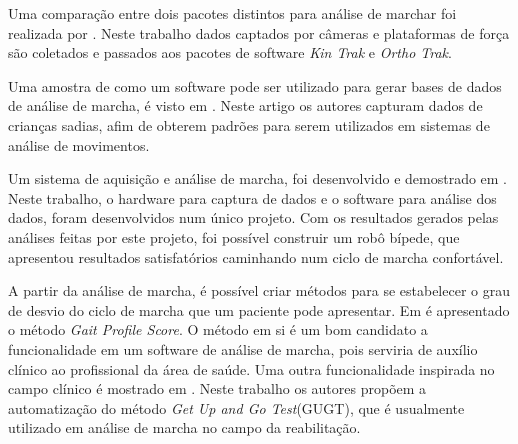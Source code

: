 Uma comparação entre dois pacotes distintos para análise de marchar foi realizada por . 
Neste trabalho dados captados por câmeras e plataformas de força são coletados e passados aos pacotes de software \emph{Kin Trak} e \emph{Ortho Trak}.

Uma amostra de como um software pode ser utilizado para gerar bases de dados de análise de marcha, é visto em . Neste artigo os autores capturam dados de crianças sadias, afim de obterem padrões para serem utilizados em sistemas de análise de movimentos.

Um sistema de aquisição e análise de marcha, foi desenvolvido e demostrado em . 
Neste trabalho, o hardware para captura de dados e o software para análise dos dados, foram desenvolvidos num único projeto.
Com os resultados gerados pelas análises feitas por este projeto, foi possível construir um robô bípede, que apresentou resultados satisfatórios caminhando num ciclo de marcha confortável.

A partir da análise de marcha, é possível criar métodos para se estabelecer o grau de desvio do ciclo de marcha que um paciente pode apresentar.
Em  é apresentado o método \emph{Gait Profile Score}.
O método em si é um bom candidato a funcionalidade em um software de análise de marcha, pois serviria de auxílio clínico ao profissional da área de saúde.
Uma outra funcionalidade inspirada no campo clínico é mostrado em . Neste trabalho os autores 
propõem a automatização do método \emph{Get Up and Go Test}(GUGT), que é usualmente utilizado em análise de marcha no campo da reabilitação.


 
